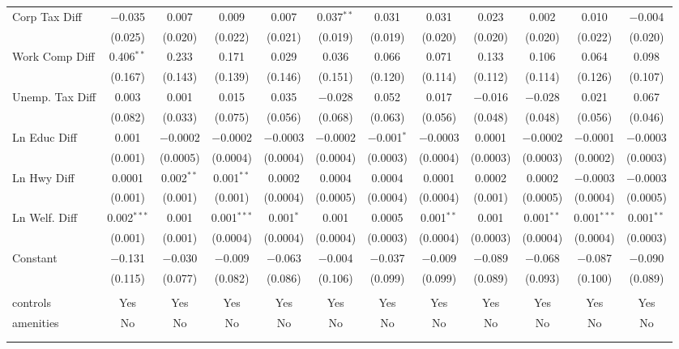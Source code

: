 \begin{table}[!htbp]
\begin{tabular}{@{\extracolsep{5pt}}lccccccccccc}
  Corp Tax Diff & $-$0.035 & 0.007 & 0.009 & 0.007 & 0.037$^{**}$ & 0.031 & 0.031 & 0.023 & 0.002 & 0.010 & $-$0.004 \\ 
  & (0.025) & (0.020) & (0.022) & (0.021) & (0.019) & (0.019) & (0.020) & (0.020) & (0.020) & (0.022) & (0.020) \\ 
  Work Comp Diff & 0.406$^{**}$ & 0.233 & 0.171 & 0.029 & 0.036 & 0.066 & 0.071 & 0.133 & 0.106 & 0.064 & 0.098 \\ 
  & (0.167) & (0.143) & (0.139) & (0.146) & (0.151) & (0.120) & (0.114) & (0.112) & (0.114) & (0.126) & (0.107) \\ 
  Unemp. Tax Diff & 0.003 & 0.001 & 0.015 & 0.035 & $-$0.028 & 0.052 & 0.017 & $-$0.016 & $-$0.028 & 0.021 & 0.067 \\ 
  & (0.082) & (0.033) & (0.075) & (0.056) & (0.068) & (0.063) & (0.056) & (0.048) & (0.048) & (0.056) & (0.046) \\ 
  Ln Educ Diff & 0.001 & $-$0.0002 & $-$0.0002 & $-$0.0003 & $-$0.0002 & $-$0.001$^{*}$ & $-$0.0003 & 0.0001 & $-$0.0002 & $-$0.0001 & $-$0.0003 \\ 
  & (0.001) & (0.0005) & (0.0004) & (0.0004) & (0.0004) & (0.0003) & (0.0004) & (0.0003) & (0.0003) & (0.0002) & (0.0003) \\ 
  Ln Hwy Diff & 0.0001 & 0.002$^{**}$ & 0.001$^{**}$ & 0.0002 & 0.0004 & 0.0004 & 0.0001 & 0.0002 & 0.0002 & $-$0.0003 & $-$0.0003 \\ 
  & (0.001) & (0.001) & (0.001) & (0.0004) & (0.0005) & (0.0004) & (0.0004) & (0.001) & (0.0005) & (0.0004) & (0.0005) \\ 
  Ln Welf. Diff & 0.002$^{***}$ & 0.001 & 0.001$^{***}$ & 0.001$^{*}$ & 0.001 & 0.0005 & 0.001$^{**}$ & 0.001 & 0.001$^{**}$ & 0.001$^{***}$ & 0.001$^{**}$ \\ 
  & (0.001) & (0.001) & (0.0004) & (0.0004) & (0.0004) & (0.0003) & (0.0004) & (0.0003) & (0.0004) & (0.0004) & (0.0003) \\ 
  Constant & $-$0.131 & $-$0.030 & $-$0.009 & $-$0.063 & $-$0.004 & $-$0.037 & $-$0.009 & $-$0.089 & $-$0.068 & $-$0.087 & $-$0.090 \\ 
  & (0.115) & (0.077) & (0.082) & (0.086) & (0.106) & (0.099) & (0.099) & (0.089) & (0.093) & (0.100) & (0.089) \\ 
 \hline \\[-1.8ex] 
controls & Yes & Yes & Yes & Yes & Yes & Yes & Yes & Yes & Yes & Yes & Yes \\ 
amenities & No & No & No & No & No & No & No & No & No & No & No \\ 
\hline \\[-1.8ex] 
\hline 
\hline \\[-1.8ex] 
\end{tabular} 
\end{table} 
